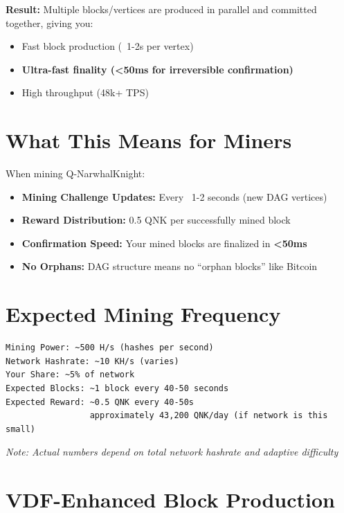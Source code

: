 \documentclass[12pt,a4paper]{article}
\begin{document}
\textbf{Result:} Multiple blocks/vertices are produced in parallel and committed together, giving you:
\begin{itemize}
    \item Fast block production (~1-2s per vertex)
    \item \textcolor{quantumgreen}{\textbf{Ultra-fast finality (<50ms for irreversible confirmation)}}
    \item High throughput (48k+ TPS)
\end{itemize}

\section{What This Means for Miners}

When mining Q-NarwhalKnight:
\begin{itemize}
    \item \textbf{Mining Challenge Updates:} Every ~1-2 seconds (new DAG vertices)
    \item \textbf{Reward Distribution:} 0.5 QNK per successfully mined block
    \item \textbf{Confirmation Speed:} Your mined blocks are finalized in \textcolor{quantumgreen}{\textbf{<50ms}}
    \item \textbf{No Orphans:} DAG structure means no ``orphan blocks'' like Bitcoin
\end{itemize}

\section{Expected Mining Frequency}

\begin{tcolorbox}[colback=quantumpurple!5,colframe=quantumpurple!50,title=Example Mining Performance (8-core CPU)]
\begin{verbatim}
Mining Power: ~500 H/s (hashes per second)
Network Hashrate: ~10 KH/s (varies)
Your Share: ~5% of network
Expected Blocks: ~1 block every 40-50 seconds
Expected Reward: ~0.5 QNK every 40-50s
                 approximately 43,200 QNK/day (if network is this small)
\end{verbatim}
\footnotesize\textit{Note: Actual numbers depend on total network hashrate and adaptive difficulty}
\end{tcolorbox}

\section{VDF-Enhanced Block Production}
\end{document}
